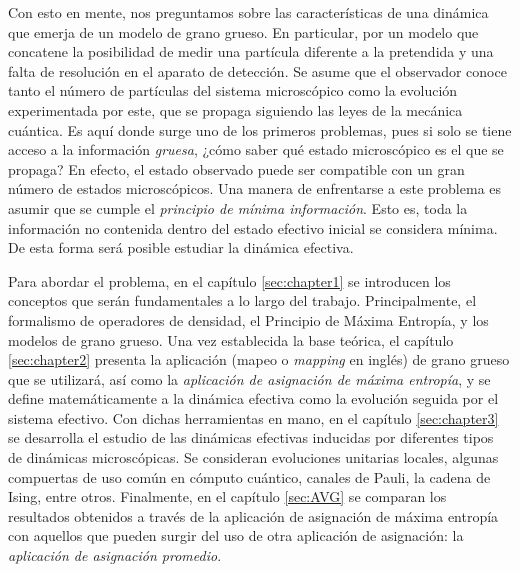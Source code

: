 

Con esto en mente, nos preguntamos sobre las características de una dinámica que emerja de un modelo de grano grueso. En particular, por un modelo que concatene la posibilidad de medir una partícula diferente a la pretendida y una falta de resolución en el aparato de detección. Se asume que el observador conoce tanto el número de partículas del sistema microscópico como la evolución experimentada por este, que se propaga siguiendo las leyes de la mecánica cuántica. Es aquí donde surge uno de los primeros problemas, pues si solo se tiene acceso a la información \textit{gruesa}, ¿cómo saber qué estado microscópico es el que se propaga? En efecto, el estado observado puede ser compatible con un gran número de estados microscópicos. Una manera de enfrentarse a este problema es asumir que se cumple el \textit{principio de mínima información}. Esto es, toda la información no contenida dentro del estado efectivo inicial se considera mínima. De esta forma será posible estudiar la dinámica efectiva. 



Para abordar el problema, en el capítulo \ref{sec:chapter1} se introducen los conceptos que serán fundamentales a lo largo del trabajo. Principalmente, el formalismo de operadores de densidad, el Principio de Máxima Entropía, y los modelos de grano grueso. Una vez establecida la base teórica, el capítulo \ref{sec:chapter2} presenta la aplicación (mapeo o \textit{mapping} en inglés) de grano grueso que se utilizará, así como la \textit{aplicación de asignación de máxima entropía}, y se define matemáticamente a la dinámica efectiva como la evolución seguida por el sistema efectivo. Con dichas herramientas en mano, en el capítulo \ref{sec:chapter3} se desarrolla el estudio de las dinámicas efectivas inducidas por diferentes tipos de dinámicas microscópicas. Se consideran evoluciones unitarias locales, algunas compuertas de uso común en cómputo cuántico, canales de Pauli, la cadena de Ising, entre otros. Finalmente, en el capítulo \ref{sec:AVG} se comparan los resultados obtenidos a través de la aplicación de asignación de máxima entropía con aquellos que pueden surgir del uso de otra aplicación de asignación: la \textit{aplicación de asignación promedio}.